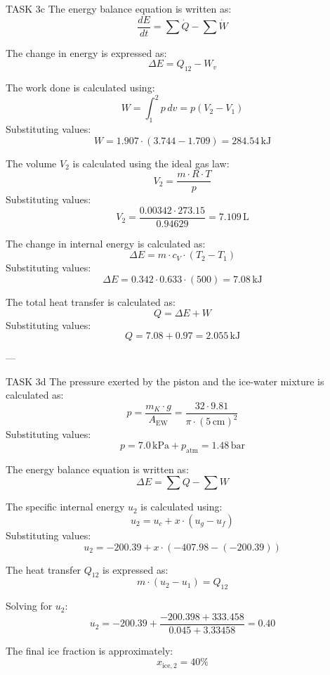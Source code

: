 TASK 3c  
The energy balance equation is written as:  
\[
\frac{dE}{dt} = \sum \dot{Q} - \sum \dot{W}
\]  

The change in energy is expressed as:  
\[
\Delta E = Q_{12} - W_v
\]  

The work done is calculated using:  
\[
W = \int_{1}^{2} p \, dv = p(V_2 - V_1)
\]  
Substituting values:  
\[
W = 1.907 \cdot (3.744 - 1.709) = 284.54 \, \text{kJ}
\]  

The volume \( V_2 \) is calculated using the ideal gas law:  
\[
V_2 = \frac{m \cdot R \cdot T}{p}
\]  
Substituting values:  
\[
V_2 = \frac{0.00342 \cdot 273.15}{0.94629} = 7.109 \, \text{L}
\]  

The change in internal energy is calculated as:  
\[
\Delta E = m \cdot c_V \cdot (T_2 - T_1)
\]  
Substituting values:  
\[
\Delta E = 0.342 \cdot 0.633 \cdot (500) = 7.08 \, \text{kJ}
\]  

The total heat transfer is calculated as:  
\[
Q = \Delta E + W
\]  
Substituting values:  
\[
Q = 7.08 + 0.97 = 2.055 \, \text{kJ}
\]  

---

TASK 3d  
The pressure exerted by the piston and the ice-water mixture is calculated as:  
\[
p = \frac{m_K \cdot g}{A_{\text{EW}}} = \frac{32 \cdot 9.81}{\pi \cdot (5 \, \text{cm})^2}
\]  
Substituting values:  
\[
p = 7.0 \, \text{kPa} + p_{\text{atm}} = 1.48 \, \text{bar}
\]  

The energy balance equation is written as:  
\[
\Delta E = \sum Q - \sum W
\]  

The specific internal energy \( u_2 \) is calculated using:  
\[
u_2 = u_c + x \cdot (u_g - u_f)
\]  
Substituting values:  
\[
u_2 = -200.39 + x \cdot (-407.98 - (-200.39))
\]  

The heat transfer \( Q_{12} \) is expressed as:  
\[
m \cdot (u_2 - u_1) = Q_{12}
\]  

Solving for \( u_2 \):  
\[
u_2 = -200.39 + \frac{-200.398 + 333.458}{0.045 + 3.33458} = 0.40
\]  

The final ice fraction is approximately:  
\[
x_{\text{ice},2} = 40\%
\]